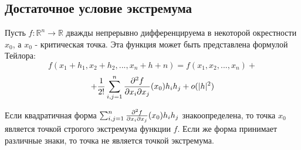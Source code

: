\subsection{Достаточное условие экстремума}
Пусть $f: \mathbb{R}^n \to \mathbb{R}$ дважды непрерывно дифференцируема в некоторой окрестности $x_0$, а $x_0$ - критическая точка. Эта функция может быть представлена формулой Тейлора:
$$f(x_1+h_1,x_2+h_2,...,x_n+h+n)= f(x_1,x_2,...,x_n)+$$
$$+ {1 \over 2!} \sum_{i,j=1}^{n}{{\partial^2 f \over \partial x_i \partial x_j}(x_0)h_i h_j} + o(|h|^2)$$
\begin{theorem}
Если квадратичная форма $\sum_{i,j=1}^{n}{{\partial^2 f \over \partial x_i \partial x_j}(x_0)h_i h_j}$ знакоопределена, то точка $x_0$ является точкой строгого экстремума функции $f$. Если же форма принимает различные знаки, то точка не является точкой экстремума.
\end{theorem}
